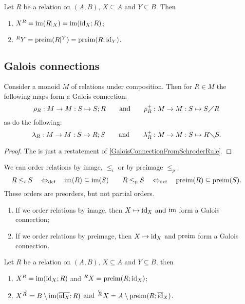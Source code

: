 \begin{lemma}
Let $R$ be a relation on $(A,B)$, $X\subseteq A$ and $Y\subseteq B$. Then
\begin{enumerate}
\item $X^R = \operatorname{im}(R|_X) = \operatorname{im}(\operatorname{id}_X;R)$;
\item $^RY = \operatorname{preim}(R|^Y) = \operatorname{preim}(R;\operatorname{id}_Y)$.
\end{enumerate}
\end{lemma}

\subsection{Galois connections}
\begin{proposition}
Consider a monoid $M$ of relations under composition. Then for $R\in M$ the following maps form a Galois connection:
\[ \rho_R: M\to M: S \mapsto S;R \qquad\text{and}\qquad \rho_R^+: M\to M: S \mapsto S\diagup R \]
as do the following:
\[ \lambda_R: M\to M: S \mapsto R;S \qquad\text{and}\qquad \lambda_R^+: M\to M: S \mapsto R\diagdown S. \]
\end{proposition}
\begin{proof}
The is just a restatement of \ref{GaloisConnectionFromSchroderRule}.
\end{proof}

\begin{proposition}
We can order relations by image, $\leq_i$ or by preimage $\leq_p$:
\[ R \leq_i S \quad\Leftrightarrow_{\text{def}}\quad \operatorname{im}(R) \subseteq \operatorname{im}(S) \qquad R \leq_p S \quad\Leftrightarrow_{\text{def}}\quad \operatorname{preim}(R) \subseteq \operatorname{preim}(S). \]
These orders are preorders, but not partial orders.
\begin{enumerate}
\item If we order relations by image, then $X\mapsto \operatorname{id}_X$ and $\operatorname{im}$ form a Galois connection;
\item If we order relations by preimage, then $X\mapsto \operatorname{id}_X$ and $\operatorname{preim}$ form a Galois connection.
\end{enumerate}
\end{proposition}

\begin{lemma}
Let $R$ be a relation on $(A,B)$, $X\subseteq A$ and $Y\subseteq B$, then
\begin{enumerate}
\item $X^R = \operatorname{im}(\operatorname{id}_X; R)$ and $^RX = \operatorname{preim}(R;\operatorname{id}_X)$;
\item $X^{\overrightarrow{R}} = B\setminus \operatorname{im}(\overline{\operatorname{id}_X}; R)$ and $^{\overleftarrow{R}}X = A\setminus \operatorname{preim}(R;\overline{\operatorname{id}}_X)$.
\end{enumerate}
\end{lemma}

